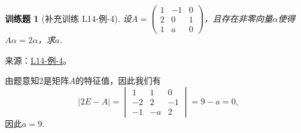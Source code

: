 \documentclass[12pt,fontset=fandol]{ctexart}
\newtheorem{exercise}{训练题}[section]
\begin{document}
\begin{exercise}[补充训练 L14-例-4]\label{prob:L14-例-4}
设$A=\begin{pmatrix}
            1 & -1 & 0 \\ 2 & 0 & 1 \\ 1 & a & 0
        \end{pmatrix}$，且存在非零向量$\alpha$使得$A\alpha=2\alpha$，求$a$.
\end{exercise}
\noindent 来源：\href{https://github.com/yhwu-is/Linear-Algebra-Left-Undone/blob/new/%E8%AE%B2%E4%B9%89/%E4%B8%93%E9%A2%98/14%20%E7%9B%B8%E4%BC%BC%E6%A0%87%E5%87%86%E5%BD%A2%EF%BC%9A%E5%8A%A8%E6%9C%BA%E4%B8%8E%E5%9F%BA%E7%A1%80.tex}{L14-例-4}。
\begin{solve}
由题意知2是矩阵$A$的特征值，因此我们有
    \[|2E-A|=\begin{vmatrix}
            1 & 1 & 0 \\ -2 & 2 & -1 \\ -1 & -a & 2
        \end{vmatrix}=9-a=0,\]
    因此$a=9$.
\end{solve}
\end{document}
